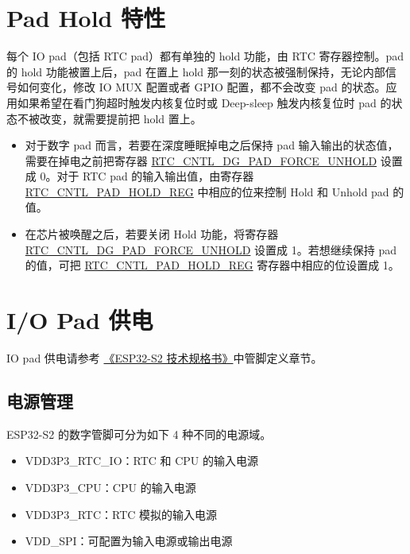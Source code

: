\documentclass[main\_\_CN.tex]{subfiles}
\begin{document}
\section{Pad Hold 特性}\label{PadHold}

每个 IO pad（包括 RTC pad）都有单独的 hold 功能，由 RTC 寄存器控制。pad 的 hold 功能被置上后，pad 在置上 hold 那一刻的状态被强制保持，无论内部信号如何变化，修改 IO MUX 配置或者 GPIO 配置，都不会改变 pad 的状态。应用如果希望在看门狗超时触发内核复位时或 Deep-sleep 触发内核复位时 pad 的状态不被改变，就需要提前把 hold 置上。
\begin{tiplisting}
\vspace{-2em}
\begin{itemize}
\item 对于数字 pad 而言，若要在深度睡眠掉电之后保持 pad 输入输出的状态值，需要在掉电之前把寄存器 \hyperref[fielddesc:RTCCNTLDGPADFORCEUNHOLD]{RTC\_\-CNTL\_\-DG\_\-PAD\_\-FORCE\_\-UNHOLD} 设置成 0。对于 RTC pad 的输入输出值，由寄存器 \hyperref[regdesc:RTCCNTLPADHOLDREG]{RTC\_\-CNTL\_\-PAD\_\-HOLD\_\-REG} 中相应的位来控制 Hold 和 Unhold pad 的值。
\item 在芯片被唤醒之后，若要关闭 Hold 功能，将寄存器 \hyperref[fielddesc:RTCCNTLDGPADFORCEUNHOLD]{RTC\_CNTL\_DG\_PAD\_FORCE\_UNHOLD} 设置成 1。若想继续保持 pad 的值，可把 \hyperref[regdesc:RTCCNTLPADHOLDREG]{RTC\_CNTL\_PAD\_HOLD\_REG} 寄存器中相应的位设置成 1。

\end{itemize}
\end{tiplisting}

\vspace{-3em}
\section{I/O Pad 供电}\label{I/O Pad Power Supplies}

IO pad 供电请参考 \href{https://www.espressif.com/sites/default/files/documentation/esp32-s2_datasheet_cn.pdf}{《ESP32-S2 技术规格书》}中管脚定义章节。

\subsection{电源管理}

ESP32-S2 的数字管脚可分为如下 4 种不同的电源域。
\begin{itemize}
\item VDD3P3\_RTC\_IO：RTC 和 CPU 的输入电源
\item VDD3P3\_CPU：CPU 的输入电源
\item VDD3P3\_RTC：RTC 模拟的输入电源
\item VDD\_SPI：可配置为输入电源或输出电源
\end{itemize}
\end{document}

